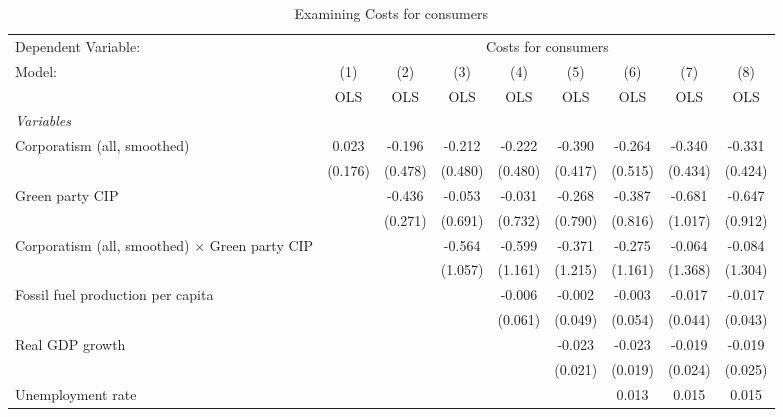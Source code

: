 
\begin{table}[htbp]
   \caption{Examining Costs for consumers}
   \centering
   \begin{tabular}{lcccccccc}
      \toprule
      Dependent Variable: & \multicolumn{8}{c}{Costs for consumers}\\
      Model:                                                & (1)     & (2)     & (3)     & (4)     & (5)     & (6)     & (7)     & (8)\\  
                                                            &  OLS    & OLS     & OLS     & OLS     & OLS     & OLS     & OLS     & OLS\\  
      \midrule
      \emph{Variables}\\
      Corporatism (all, smoothed)                           & 0.023   & -0.196  & -0.212  & -0.222  & -0.390  & -0.264  & -0.340  & -0.331\\   
                                                            & (0.176) & (0.478) & (0.480) & (0.480) & (0.417) & (0.515) & (0.434) & (0.424)\\   
      Green party CIP                                       &         & -0.436  & -0.053  & -0.031  & -0.268  & -0.387  & -0.681  & -0.647\\   
                                                            &         & (0.271) & (0.691) & (0.732) & (0.790) & (0.816) & (1.017) & (0.912)\\   
      Corporatism (all, smoothed) $\times$ Green party CIP  &         &         & -0.564  & -0.599  & -0.371  & -0.275  & -0.064  & -0.084\\   
                                                            &         &         & (1.057) & (1.161) & (1.215) & (1.161) & (1.368) & (1.304)\\   
      Fossil fuel production per capita                     &         &         &         & -0.006  & -0.002  & -0.003  & -0.017  & -0.017\\   
                                                            &         &         &         & (0.061) & (0.049) & (0.054) & (0.044) & (0.043)\\   
      Real GDP growth                                       &         &         &         &         & -0.023  & -0.023  & -0.019  & -0.019\\   
                                                            &         &         &         &         & (0.021) & (0.019) & (0.024) & (0.025)\\   
      Unemployment rate                                     &         &         &         &         &         & 0.013   & 0.015   & 0.015\\   

\end{tabular}
\end{table}
